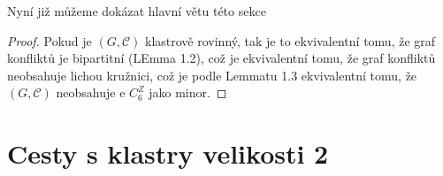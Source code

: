 \documentclass[12pt,a4report]{report}
\begin{document}
Nyní již můžeme dokázat hlavní větu této sekce
\begin{proof}
Pokud je $(G,\mathcal C)$ klastrově rovinný, tak je to ekvivalentní tomu, že graf konfliktů je bipartitní (LEmma 1.2), což je ekvivalentní tomu, že graf konfliktů neobsahuje lichou kružnici, což je podle Lemmatu 1.3 ekvivalentní tomu, že $(G,\mathcal C)$ neobsahuje e $C_6^Z$ jako minor.
\end{proof}

\section{Cesty s klastry velikosti 2}
\end{document}
